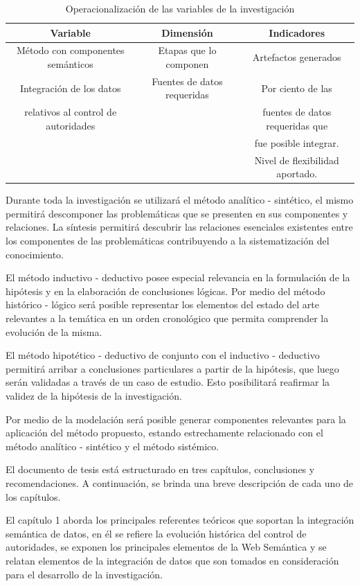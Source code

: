 \begin{table}
\centering
\begin{tabular}{c|c|c}
\hline 
Variable & Dimensión & Indicadores \\ 
\hline 
Método con componentes semánticos & Etapas que lo componen & Artefactos generados \\ 
\hline 
Integración de los datos  & Fuentes de datos requeridas & Por ciento de las \\
relativos al control de autoridades & & fuentes de datos requeridas que  \\ 
 & & fue posible integrar. \\
 & & Nivel de flexibilidad aportado. \\
 \hline
\end{tabular} 
\label{tabla:operacionalizacion}
\caption{Operacionalización de las variables de la investigación}
\end{table}


Durante toda la investigación se utilizará el método analítico - sintético, el mismo permitirá descomponer las problemáticas que se presenten en sus componentes y relaciones. La síntesis permitirá descubrir las relaciones esenciales existentes entre los componentes de las problemáticas contribuyendo a la sistematización del conocimiento. 

El método inductivo - deductivo posee especial relevancia en la formulación de la hipótesis y en la elaboración de conclusiones lógicas. Por medio del método histórico - lógico será posible representar los elementos del estado del arte relevantes a la temática en un orden cronológico que permita comprender la evolución de la misma.

El método hipotético - deductivo de conjunto con el inductivo - deductivo permitirá arribar a conclusiones particulares a partir de la hipótesis, que luego serán validadas a través de un caso de estudio. Esto posibilitará reafirmar la validez de la hipótesis de la investigación.

Por medio de la modelación será posible generar componentes relevantes para la aplicación del método propuesto, estando estrechamente relacionado con el método analítico - sintético y el método sistémico.

El documento de tesis está estructurado en tres capítulos, conclusiones y recomendaciones. A continuación, se brinda una breve descripción de cada uno de los capítulos.

El capítulo 1 aborda los principales referentes teóricos que soportan la integración semántica de datos, en él se refiere la evolución histórica del control de autoridades, se exponen los principales elementos de la Web Semántica y se relatan elementos de la integración de datos que son tomados en consideración para el desarrollo de la investigación.

